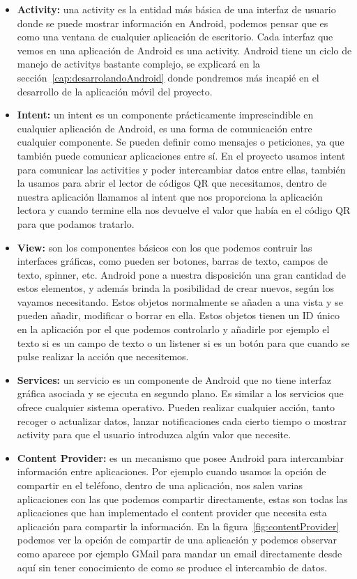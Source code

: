 \begin{itemize}

\item \textbf{Activity:} una activity es la entidad más básica de una interfaz de usuario donde se puede mostrar información en Android, podemos pensar que es como una ventana de cualquier aplicación de escritorio. Cada interfaz que vemos en una aplicación de Android es una activity. Android tiene un ciclo de manejo de activitys bastante complejo, se explicará en la sección~\ref{cap:desarrolandoAndroid} donde pondremos más incapié en el desarrollo de la aplicación móvil del proyecto.

\item \textbf{Intent:} un intent es un componente prácticamente imprescindible en cualquier aplicación de Android, es una forma de comunicación entre cualquier componente. Se pueden definir como mensajes o peticiones, ya que también puede comunicar aplicaciones entre sí. En el proyecto usamos intent para comunicar las activities y poder intercambiar datos entre ellas, también la usamos para abrir el lector de códigos QR que necesitamos, dentro de nuestra aplicación llamamos al intent que nos proporciona la aplicación lectora y cuando termine ella nos devuelve el valor que había en el código QR para que podamos tratarlo.

\item \textbf{View:} son los componentes básicos con los que podemos contruir las interfaces gráficas, como pueden ser botones, barras de texto, campos de texto, spinner, etc. Android pone a nuestra disposición una gran cantidad de estos elementos, y además brinda la posibilidad de crear nuevos, según los vayamos necesitando. Estos objetos normalmente se añaden a una vista y se pueden añadir, modificar o borrar en ella. Estos objetos tienen un ID único en la aplicación por el que podemos controlarlo y añadirle por ejemplo el texto si es un campo de texto o un listener si es un botón para que cuando se pulse realizar la acción que necesitemos.

\item \textbf{Services:} un servicio es un componente de Android que no tiene interfaz gráfica asociada y se ejecuta en segundo plano. Es similar a los servicios que ofrece cualquier sistema operativo. Pueden realizar cualquier acción, tanto recoger o actualizar datos, lanzar notificaciones cada cierto tiempo o mostrar activity para que el usuario introduzca algún valor que necesite.

\item \textbf{Content Provider:} es un mecanismo que posee Android para intercambiar información entre aplicaciones. Por ejemplo cuando usamos la opción de compartir en el teléfono, dentro de una aplicación, nos salen varias aplicaciones con las que podemos compartir directamente, estas son todas las aplicaciones que han implementado el content provider que necesita esta aplicación para compartir la información. En la figura~\ref{fig:contentProvider} podemos ver la opción de compartir de una aplicación y podemos observar como aparece por ejemplo GMail para mandar un email directamente desde aquí sin tener conocimiento de como se produce el intercambio de datos.
 

\end{itemize}
